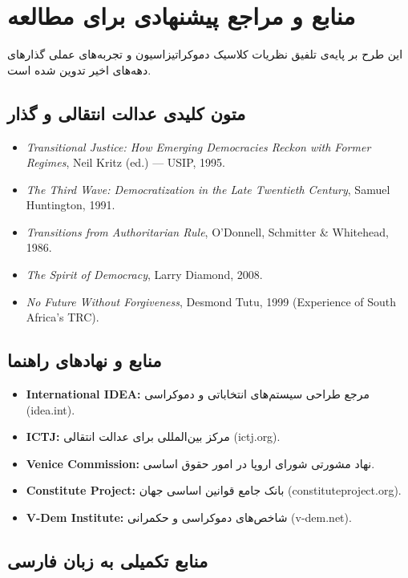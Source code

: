\chapter{منابع و مراجع پیشنهادی برای مطالعه}
\label{app:references}

این طرح بر پایه‌ی تلفیق نظریات کلاسیک دموکراتیزاسیون و تجربه‌های عملی گذارهای دهه‌های اخیر تدوین شده است.

\section{متون کلیدی عدالت انتقالی و گذار}

\begin{itemize}
    \item \textit{Transitional Justice: How Emerging Democracies Reckon with Former Regimes}, Neil Kritz (ed.) — USIP, 1995.
    \item \textit{The Third Wave: Democratization in the Late Twentieth Century}, Samuel Huntington, 1991.
    \item \textit{Transitions from Authoritarian Rule}, O'Donnell, Schmitter \& Whitehead, 1986.
    \item \textit{The Spirit of Democracy}, Larry Diamond, 2008.
    \item \textit{No Future Without Forgiveness}, Desmond Tutu, 1999 (Experience of South Africa's TRC).
\end{itemize}

\section{منابع و نهادهای راهنما}

\begin{itemize}
    \item \textbf{International IDEA:} مرجع طراحی سیستم‌های انتخاباتی و دموکراسی (idea.int).
    \item \textbf{ICTJ:} مرکز بین‌المللی برای عدالت انتقالی (ictj.org).
    \item \textbf{Venice Commission:} نهاد مشورتی شورای اروپا در امور حقوق اساسی.
    \item \textbf{Constitute Project:} بانک جامع قوانین اساسی جهان (constituteproject.org).
    \item \textbf{V-Dem Institute:} شاخص‌های دموکراسی و حکمرانی (v-dem.net).
\end{itemize}

\section{منابع تکمیلی به زبان فارسی}

